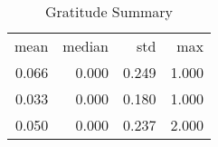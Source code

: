 \begin{table}[ht]
\centering
\caption{Gratitude Summary} 
\begin{tabular}{rrrr}
 mean & median & std & max \\ 
 0.066 & 0.000 & 0.249 & 1.000 \\ 
   \hline
0.033 & 0.000 & 0.180 & 1.000 \\ 
  0.050 & 0.000 & 0.237 & 2.000 \\ 
  \end{tabular}
\end{table}
